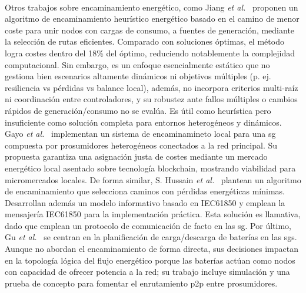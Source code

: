 \\
Otros trabajos sobre encaminamiento energético, como Jiang \textit{et al.}~\cite{Jiang19} proponen un algoritmo de encaminamiento heurístico energético basado en el camino de menor coste para unir nodos con cargas de consumo, a fuentes de generación, mediante la selección de rutas eficientes. Comparado con soluciones óptimas, el método logra costes dentro del 18\% del óptimo, reduciendo notablemente la complejidad computacional. Sin embargo, es un enfoque esencialmente estático que no gestiona bien escenarios altamente dinámicos ni objetivos múltiples (p. ej. resiliencia vs pérdidas vs balance local), además, no incorpora criterios multi-raíz ni coordinación entre controladores, y  su robustez ante fallos múltiples o cambios rápidos de generación/consumo no se evalúa. Es útil como heurística pero insuficiente como solución completa para entornos heterogéneos y dinámicos. Gayo \textit{et al.}~\cite{Gayo20} implementan un sistema de encaminamineto local para una \gls{sg} compuesta por prosumidores heterogéneos conectados a la red principal. Su propuesta garantiza una asignación justa de costes mediante un mercado energético local asentado sobre tecnología blockchain, mostrando viabilidad para micromercados locales. De forma similar, S. Hussain \textit{et al.}~\cite{S-Hussain20} plantean un algoritmo de encaminamiento que selecciona caminos con pérdidas energéticas mínimas. Desarrollan además un modelo informativo basado en IEC61850 y emplean la mensajería IEC61850 para la implementación práctica. Esta solución es llamativa, dado que emplean un protocolo de comunicación de facto en las \gls{sg}. Por último, Gu \textit{et al.}~\cite{Gu22} se centran en la planificación de carga/descarga de baterías en las \glspl{sg}. Aunque no abordan el encaminamiento de forma directa, sus decisiones impactan en la topología lógica del flujo energético porque las baterías actúan como nodos con capacidad de ofrecer potencia a la red; su trabajo incluye simulación y una prueba de concepto para fomentar el enrutamiento \gls{p2p} entre prosumidores.\\
\\
